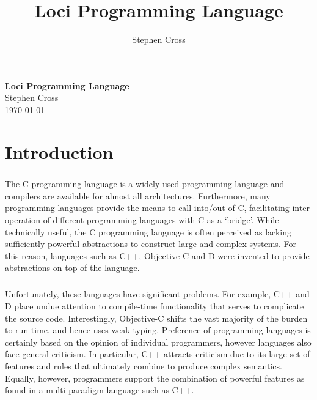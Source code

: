 \documentclass[12pt,twoside,notitlepage]{report}
\title{Loci Programming Language}
\author{Stephen Cross}
\begin{document}
\pagestyle{empty}

\vspace*{60mm}
\begin{center}
\Huge
{\bf Loci Programming Language} \\
\vspace*{5mm}
Stephen Cross \\
\vspace*{5mm}
\today  %
\end{center}

\cleardoublepage


\setcounter{page}{1}
\pagestyle{plain}

\tableofcontents

\listoffigures

\cleardoublepage


\setcounter{page}{1}
\pagestyle{headings}

\chapter{Introduction}

\paragraph{}
The C programming language is a widely used programming language and compilers are available for almost all architectures. Furthermore, many programming languages provide the means to call into/out-of C, facilitating inter-operation of different programming languages with C as a `bridge'. While technically useful, the C programming language is often perceived as lacking sufficiently powerful abstractions to construct large and complex systems. For this reason, languages such as C++, Objective C and D were invented to provide abstractions on top of the language.

\paragraph{}
Unfortunately, these languages have significant problems. For example, C++ and D place undue attention to compile-time functionality that serves to complicate the source code. Interestingly, Objective-C shifts the vast majority of the burden to run-time, and hence uses weak typing. Preference of programming languages is certainly based on the opinion of individual programmers, however languages also face general criticism. In particular, C++ attracts criticism due to its large set of features and rules that ultimately combine to produce complex semantics. Equally, however, programmers support the combination of powerful features as found in a multi-paradigm language such as C++.
\end{document}
